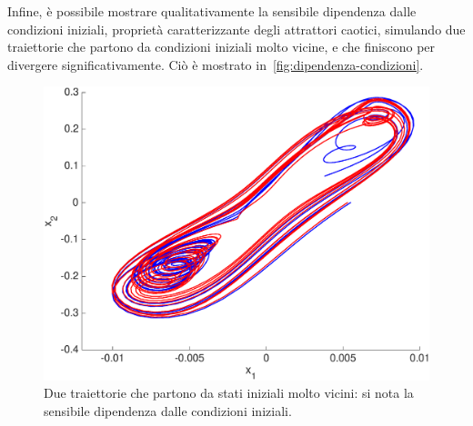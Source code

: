 Infine, è possibile mostrare qualitativamente la sensibile dipendenza dalle condizioni iniziali, proprietà caratterizzante degli attrattori caotici, simulando due traiettorie che partono da condizioni iniziali molto vicine, e che finiscono per divergere significativamente. Ciò è mostrato in~\autoref{fig:dipendenza-condizioni}.

\begin{figure}
    \centering
    \includegraphics[width=\textwidth]{matcont/DipendenzaCondizioniIniziali}
    \caption{Due traiettorie che partono da stati iniziali molto vicini: si nota la sensibile dipendenza dalle condizioni iniziali.}
    \label{fig:dipendenza-condizioni}
\end{figure}
